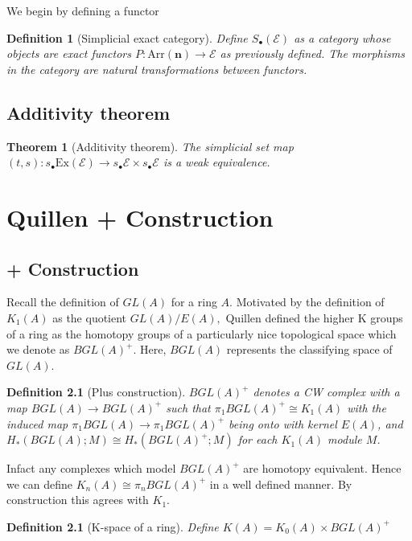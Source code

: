 \documentclass[12pt]{report}
\numberwithin{equation}{section}
\newtheorem{theorem}[dummy]{Theorem}
\newtheorem{definition}[dummy]{Definition}
\begin{document}
	We begin by defining a functor
	
	\begin{definition}[Simplicial exact category]
		Define \( S_\bullet(\mathcal{E}) \) as a category whose objects are exact functors \( P:\mathrm{Arr} (\mathbf{n}) \to \mathcal{E}\) as previously defined. The morphisms in the category are natural transformations between functors.
	\end{definition}
	
	\section{Additivity theorem}
	\begin{theorem}[Additivity theorem]
		The simplicial set map \( (t,s) : s_\bullet \mathrm{Ex}(\mathcal{E}) \to s_\bullet \mathcal{ E}  \times s_\bullet \mathcal{E}\) is a weak equivalence.
	\end{theorem}
	
	\chapter{Quillen + Construction}
	
	
	\section{+ Construction}
	Recall the definition of $GL(A)$ for a ring $A$. Motivated by the definition of $K_1(A) $ as the quotient $GL(A)/E(A),$ Quillen defined the higher K groups of a ring as the homotopy groups of a particularly nice topological space which we denote as $BGL(A)^+$. Here, $BGL(A)$ represents the classifying space of $GL(A)$.
	
	\begin{definition}[Plus construction]
		$BGL(A)^+$ denotes a CW complex with a map $BGL(A)\to BGL(A)^+$ such that $\pi_1 BGL(A)^+ \cong K_1(A)$ with the induced map $\pi_1BGL(A) \to \pi_1 BGL(A)^+$ being onto with kernel $E(A)$, and $H_*(BGL(A);	M) \cong H_*(BGL(A)^+;M) $ for each $K_1(A)$ module $M$.
	\end{definition}
	Infact any complexes which model $BGL(A)^+$ are homotopy equivalent. Hence we can define $K_n(A)\cong \pi_n BGL(A)^+$ in a well defined manner. By construction this agrees with $K_1$.
	\begin{definition}[K-space of a ring]
		Define $K(A) = K_0(A)\times BGL(A)^+$
	\end{definition}
\end{document}
